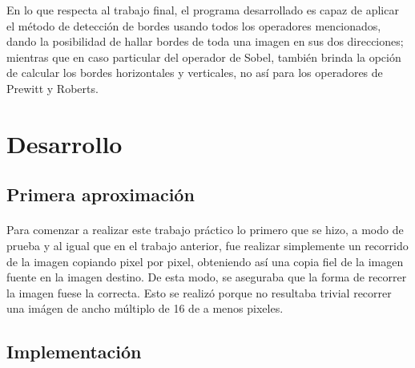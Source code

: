 \documentclass[11pt, a4paper]{article}
\begin{document}
En lo que respecta al trabajo final, el programa desarrollado es capaz de aplicar el m\'etodo de detecci\'on de bordes usando todos los operadores mencionados, dando la posibilidad de hallar bordes de toda una imagen en sus dos direcciones; mientras que en caso particular del operador de Sobel, tambi\'en brinda la opci\'on de calcular los bordes horizontales y verticales, no as\'i para los operadores de Prewitt y Roberts.

\newpage

\section{Desarrollo}

\subsection{Primera aproximaci\'on}
\paragraph{}
Para comenzar a realizar este trabajo pr\'actico lo primero que se hizo, a modo de prueba y al igual que en el trabajo anterior, fue realizar simplemente un recorrido de la imagen copiando pixel por pixel, obteniendo as\'i una copia fiel de la imagen fuente en la imagen destino. De esta modo, se aseguraba que la forma de recorrer la imagen fuese la correcta. Esto se realiz\'o porque no resultaba trivial recorrer una im\'agen de ancho m\'ultiplo de 16 de a menos pixeles.

\subsection{Implementaci\'on}
\end{document}
